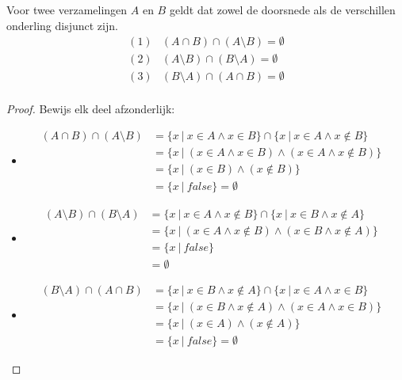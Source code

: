 \documentclass[main.tex]{subfiles}
\begin{document}
\begin{pr}
  Voor twee verzamelingen $A$ en $B$ geldt dat zowel de doorsnede als de verschillen onderling disjunct zijn.
  \[ 
  \begin{array}{rl}
    (1) & (A \cap B) \cap (A \setminus B) = \emptyset\\
    (2) & (A \setminus B) \cap (B \setminus A) = \emptyset\\
    (3) & (B \setminus A) \cap (A \cap B) = \emptyset\\
  \end{array}
  \]
  \begin{proof}
    Bewijs elk deel afzonderlijk:
    \begin{itemize}
    \item 
      \[
      \begin{array}{rll}
        (A \cap B) \cap (A \setminus B) &= \{ x\ |\ x \in A \wedge x \in B\} \cap \{ x\ |\ x \in A \wedge x \not\in B \}&\\
        &= \{ x\ |\ (x \in A \wedge x \in B)\wedge (x \in A \wedge x \not\in B) \}&\\
        &= \{ x\ |\ (x \in B)\wedge (x \not\in B) \}&\\
        &= \{ x\ |\ false \} = \emptyset
      \end{array}
      \]
    \item
      \[
      \begin{array}{rll}
        (A \setminus B) \cap (B \setminus A) &= \{ x\ |\ x \in A \wedge x \not\in B \} \cap \{ x\ |\ x \in B \wedge x \not\in A \}&\\
                                             &= \{ x\ |\ (x \in A \wedge x \not\in B) \wedge (x \in B \wedge x \not\in A) \}&\\
                                             &= \{ x\ |\ false \}&\\
                                             &= \emptyset
      \end{array}
      \]
    \item 
      \[
      \begin{array}{rll}
        (B \setminus A) \cap (A \cap B) &= \{ x\ |\ x \in B\wedge x \not\in A \} \cap \{ x\ |\ x \in A \wedge x \in B\}&\\
        &= \{ x\ |\ (x \in B \wedge x \not\in A) \wedge (x \in A \wedge x \in B) \}&\\
        &= \{ x\ |\ (x \in A)\wedge (x \not\in A) \}&\\
        &= \{ x\ |\ false \} = \emptyset
      \end{array}
      \]
    \end{itemize}
  \end{proof}
\end{pr}
\end{document}
